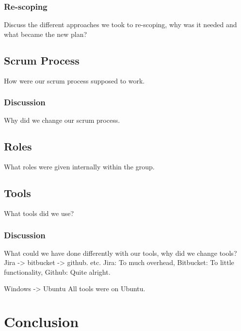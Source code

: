 \subsection{Re-scoping}
Discuss the different approaches we took to re-scoping,
why was it needed and what became the new plan?

\section{Scrum Process}
How were our scrum process supposed to work.
\subsection{Discussion}
Why did we change our scrum process.

\section{Roles}
What roles were given internally within the group.

\section{Tools}
What tools did we use?

\subsection{Discussion}
What could we have done differently with our tools,
why did we change tools?
Jira -> bitbucket -> github. etc.
Jira: To much overhead,
Bitbucket: To little functionality,
Github: Quite alright.

Windows -> Ubuntu
All tools were on Ubuntu.

\chapter{Conclusion}
\label{chap:conclusion}

